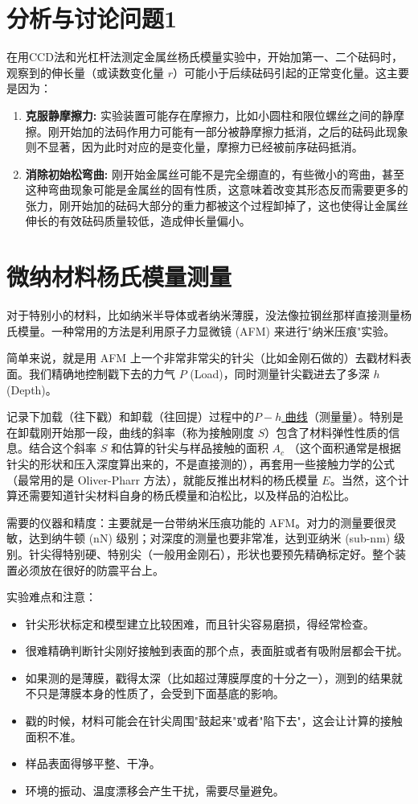 \documentclass[12pt]{article}
\begin{document}
\section{分析与讨论问题1}
\quad 在用CCD法和光杠杆法测定金属丝杨氏模量实验中，开始加第一、二个砝码时，观察到的伸长量（或读数变化量 $r$）可能小于后续砝码引起的正常变化量。这主要是因为：
\begin{enumerate}
    \item \textbf{克服静摩擦力:} 实验装置可能存在摩擦力，比如小圆柱和限位螺丝之间的静摩擦。刚开始加的法码作用力可能有一部分被静摩擦力抵消，之后的砝码此现象则不显著，因为此时对应的是变化量，摩擦力已经被前序砝码抵消。
    \item \textbf{消除初始松弯曲:} 刚开始金属丝可能不是完全绷直的，有些微小的弯曲，甚至这种弯曲现象可能是金属丝的固有性质，这意味着改变其形态反而需要更多的张力，刚开始加的砝码大部分的重力都被这个过程卸掉了，这也使得让金属丝伸长的有效砝码质量较低，造成伸长量偏小。
\end{enumerate}
\section{{微纳材料杨氏模量测量}}

\quad 对于特别小的材料，比如纳米半导体或者纳米薄膜，没法像拉钢丝那样直接测量杨氏模量。一种常用的方法是利用原子力显微镜 (AFM) 来进行"纳米压痕"实验。

简单来说，就是用 AFM 上一个非常非常尖的针尖（比如金刚石做的）去戳材料表面。我们精确地控制戳下去的力气 $P$ (Load)，同时测量针尖戳进去了多深 $h$ (Depth)。

记录下加载（往下戳）和卸载（往回提）过程中的\underline{$P-h$ 曲线}（测量量）。特别是在卸载刚开始那一段，曲线的斜率（称为接触刚度 $S$）包含了材料弹性性质的信息。结合这个斜率 $S$ 和估算的针尖与样品接触的面积 $A_c$ （这个面积通常是根据针尖的形状和压入深度算出来的，不是直接测的），再套用一些接触力学的公式（最常用的是 Oliver-Pharr 方法），就能反推出材料的杨氏模量 $E$。当然，这个计算还需要知道针尖材料自身的杨氏模量和泊松比，以及样品的泊松比。


需要的仪器和精度：主要就是一台带纳米压痕功能的 AFM。对力的测量要很灵敏，达到纳牛顿 (nN) 级别；对深度的测量也要非常准，达到亚纳米 (sub-nm) 级别。针尖得特别硬、特别尖（一般用金刚石），形状也要预先精确标定好。整个装置必须放在很好的防震平台上。\\
\par
实验难点和注意：
\begin{itemize}
    \item 针尖形状标定和模型建立比较困难，而且针尖容易磨损，得经常检查。
    \item 很难精确判断针尖刚好接触到表面的那个点，表面脏或者有吸附层都会干扰。
    \item 如果测的是薄膜，戳得太深（比如超过薄膜厚度的十分之一），测到的结果就不只是薄膜本身的性质了，会受到下面基底的影响。
    \item 戳的时候，材料可能会在针尖周围"鼓起来"或者"陷下去"，这会让计算的接触面积不准。
    \item 样品表面得够平整、干净。
    \item 环境的振动、温度漂移会产生干扰，需要尽量避免。
\end{itemize}
\end{document}
